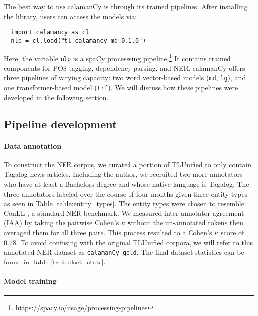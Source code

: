 \documentclass[11pt]{article}
\begin{document}
The best way to use calamanCy is through its trained pipelines.
After installing the library, users can access the models via:

\begin{verbatim}
  import calamancy as cl
  nlp = cl.load("tl_calamancy_md-0.1.0")
\end{verbatim}

Here, the variable \texttt{nlp} is a spaCy processsing pipeline.\footnote[2]{\url{https://spacy.io/usage/processing-pipelines}}
It contains trained components for POS tagging, dependency parsing, and NER.
calamanCy offers three pipelines of varying capacity: two word vector-based models (\texttt{md}, \texttt{lg}), and one transformer-based model (\texttt{trf}).
We will discuss how these pipelines were developed in the following section.

\subsection{Pipeline development}

\paragraph*{Data annotation}
To construct the NER corpus, we curated a portion of TLUnified \citep{Cruz2021ImprovingLL} to only contain Tagalog news articles.
Including the author, we recruited two more annotators who have at least a Bachelors degree and whose native language is Tagalog.
The three annotators labeled over the course of four months given three entity types as seen in Table \ref{table:entity_types}.
The entity types were chosen to resemble ConLL \citep{Sang2002IntroductionTT,Sang2003IntroductionTT}, a standard NER benchmark.
We measured inter-annotator agreement (IAA) by taking the pairwise Cohen's $\kappa$ without the un-annotated tokens then averaged them for all three pairs.
This process resulted to a Cohen's $\kappa$ score of 0.78. 
To avoid confusing with the original TLUnified corpora, we will refer to this annotated NER dataset as \texttt{calamanCy-gold}.
The final dataset statistics can be found in Table \ref{table:dset_stats}.



\paragraph*{Model training}
\end{document}
